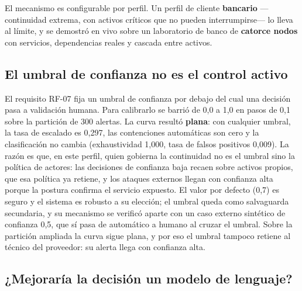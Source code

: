 El mecanismo es configurable por perfil. Un perfil de cliente \textbf{bancario} ---continuidad
extrema, con activos críticos que no pueden interrumpirse--- lo lleva al límite, y se demostró en
vivo sobre un laboratorio de banco de \textbf{catorce nodos} con servicios, dependencias reales y
cascada entre activos.

\subsection{El umbral de confianza no es el control activo}

El requisito RF-07 fija un umbral de confianza por debajo del cual una decisión pasa a validación
humana. Para calibrarlo se barrió de 0,0 a 1,0 en pasos de 0,1 sobre la partición de 300 alertas. La
curva resultó \textbf{plana}: con cualquier umbral, la tasa de escalado es 0,297, las contenciones
automáticas son cero y la clasificación no cambia (exhaustividad 1,000, tasa de falsos positivos
0,009). La razón es que, en este perfil, quien gobierna la continuidad no es el umbral sino la
política de actores: las decisiones de confianza baja recaen sobre activos propios, que esa
política ya retiene, y los ataques externos llegan con confianza alta porque la postura confirma el
servicio expuesto. El valor por defecto (0,7) es seguro y el sistema es robusto a su elección; el
umbral queda como salvaguarda secundaria, y su mecanismo se verificó aparte con un caso externo
sintético de confianza 0,5, que sí pasa de automático a humano al cruzar el umbral. Sobre la
partición ampliada la curva sigue plana, y por eso el umbral tampoco retiene al técnico del
proveedor: su alerta llega con confianza alta.

\subsection{¿Mejoraría la decisión un modelo de lenguaje?}

